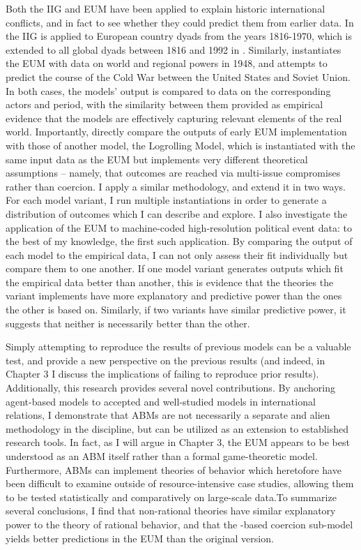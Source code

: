 Both the IIG and EUM have been applied to explain historic international conflicts, and in fact to see whether they could predict them from earlier data. In \citet{bdm_1992} the IIG is applied to European country dyads from the years 1816-1970, which is extended to all global dyads between 1816 and 1992 in \citet{bennett_2000}. Similarly, \citet{bdm_1998} instantiates the EUM with data on world and regional powers in 1948, and attempts to predict the course of the Cold War between the United States and Soviet Union. In both cases, the models' output is compared to data on the corresponding actors and period, with the similarity between them provided as empirical evidence that the models are effectively capturing relevant elements of the real world. Importantly, \citet{stokman_1994b} directly compare the outputs of early EUM implementation \citep{bdm_1994} with those of another model, the \citet{stokman_1994} Logrolling Model, which is instantiated with the same input data as the EUM but implements very different theoretical assumptions -- namely, that outcomes are reached via multi-issue compromises rather than coercion. I apply a similar methodology, and extend it in two ways. For each model variant, I run multiple instantiations in order to generate a distribution of outcomes which I can describe and explore. I also investigate the application of the EUM to machine-coded high-resolution political event data: to the best of my knowledge, the first such application. By comparing the output of each model to the empirical data, I can not only assess their fit individually but compare them to one another. If one model variant generates outputs which fit the empirical data better than another, this is evidence that the theories the variant implements have more explanatory and predictive power than the ones the other is based on. Similarly, if two variants have similar predictive power, it suggests that neither is necessarily better than the other.

Simply attempting to reproduce the results of previous models can be a valuable test, and provide a new perspective on the previous results (and indeed, in Chapter 3 I discuss the implications of failing to reproduce prior results). Additionally, this research provides several novel contributions. By anchoring agent-based models to accepted and well-studied models in international relations, I demonstrate that ABMs are not necessarily a separate and alien methodology in the discipline, but can be utilized as an extension to established research tools. In fact, as I will argue in Chapter 3, the EUM appears to be best understood as an ABM itself rather than a formal game-theoretic model. Furthermore, ABMs can implement theories of behavior which heretofore have been difficult to examine outside of resource-intensive case studies, allowing them to be tested statistically and comparatively on large-scale data.To summarize several conclusions, I find that non-rational theories have similar explanatory power to the theory of rational behavior, and that the \citet{schelling_1966}-based coercion sub-model yields better predictions in the EUM than the original version.

